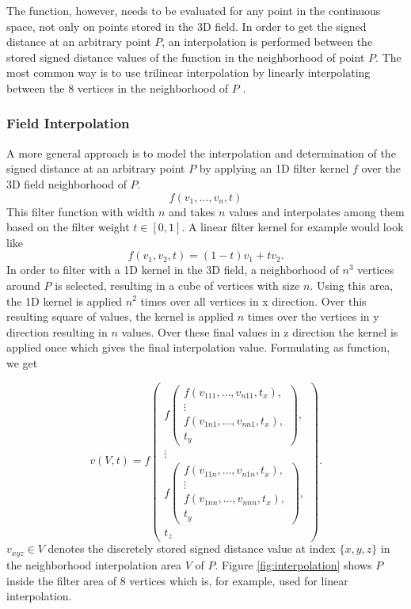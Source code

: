\documentclass[12pt]{article}
\begin{document}
The function, however, needs to be evaluated for any point in the continuous space, not only on points stored in the 3D field. In order to get the signed distance at an arbitrary point $P$, an interpolation is performed between the stored signed distance values of the function in the neighborhood of point $P$. The most common way is to use trilinear interpolation by linearly interpolating between the 8 vertices in the neighborhood of $P$ \cite{calakli:2011}.

\subsubsection{Field Interpolation}
A more general approach is to model the interpolation and determination of the signed distance at an arbitrary point $P$ by applying an 1D filter kernel $f$ over the 3D field neighborhood of $P$. 
\begin{equation}
f(v_1, \dots, v_n, t)
\end{equation}
This filter function with width $n$ and takes $n$ values and interpolates among them based on the filter weight $t \in [0, 1]$. 
A linear filter kernel for example would look like
\begin{equation}\label{eq:linearint}
f(v_1, v_2, t) = (1 - t) v_1 + t v_2
.\end{equation}
In order to filter with a 1D kernel in the 3D field, a neighborhood of $n^3$ vertices around $P$ is selected, resulting in a cube of vertices with size $n$. Using this area, the 1D kernel is applied $n^2$ times over all vertices in x direction. Over this resulting square of values, the kernel is applied $n$ times over the vertices in y direction resulting in $n$ values. Over these final values in z direction the kernel is applied once which gives the final interpolation value. Formulating as function, we get
 
\begin{equation} \label{eq:intfunc}
v(V, t) = f
\begin{pmatrix}
f 
\begin{pmatrix}
f(v_{111}, \dots, v_{n11}, t_x), \\
\vdots \\
f(v_{1n1}, \dots, v_{nn1}, t_x), \\
t_y
\end{pmatrix}, \\
\vdots \\
f
\begin{pmatrix}
f(v_{11n}, \dots, v_{n1n}, t_x), \\
\vdots \\
f(v_{1nn}, \dots, v_{nnn}, t_x), \\
t_y
\end{pmatrix}, \\[2.5em]
t_z
\end{pmatrix}
.\end{equation}
$v_{xyz} \in V$ denotes the discretely stored signed distance value at index $\{x, y, z\}$ in the neighborhood interpolation area $V$ of $P$. Figure \ref{fig:interpolation} shows $P$ inside the filter area of 8 vertices which is, for example, used for linear interpolation.
\end{document}
